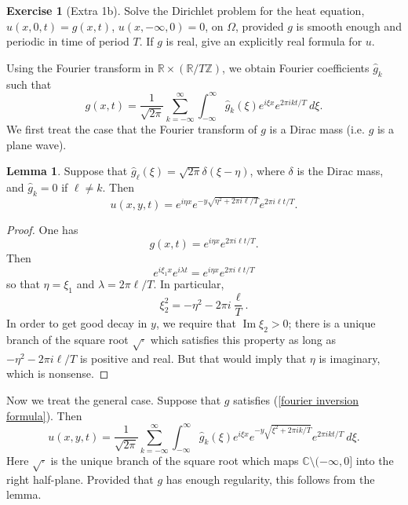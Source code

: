 \documentclass[10pt]{article}
\newcommand{\ZZ}{\mathbb{Z}}
\newcommand{\RR}{\mathbb{R}}
\newcommand{\CC}{\mathbb{C}}
\renewcommand{\Im}{\operatorname{Im}}
\theoremstyle{definition}
\newtheorem{exer}{Exercise}
\newtheorem{lemma}{Lemma}[exer]
\begin{document}
\begin{exer}[Extra 1b]
Solve the Dirichlet problem for the heat equation, $u(x, 0, t) = g(x, t)$, $u(x, -\infty, 0) = 0$, on $\Omega$, provided $g$ is smooth enough and periodic in time of period $T$.
If $g$ is real, give an explicitly real formula for $u$.
\end{exer}

Using the Fourier transform in $\RR \times (\RR/T\ZZ)$, we obtain Fourier coefficients $\hat g_k$ such that
\begin{equation}
\label{fourier inversion formula}
g(x, t) = \frac{1}{\sqrt{2\pi}} \sum_{k=-\infty}^\infty \int_{-\infty}^\infty \hat g_k(\xi) e^{i\xi x} e^{2\pi i kt/T}~d\xi.
\end{equation}
We first treat the case that the Fourier transform of $g$ is a Dirac mass (i.e. $g$ is a plane wave).

\begin{lemma}
Suppose that $\hat g_\ell(\xi) = \sqrt{2\pi}\delta(\xi - \eta)$, where $\delta$ is the Dirac mass, and $\hat g_k = 0$ if $\ell \neq k$.
Then
$$u(x, y, t) = e^{i\eta x} e^{-y\sqrt{\eta^2 + 2\pi i\ell/T}} e^{2\pi i\ell t/T}.$$
\end{lemma}
\begin{proof}
One has
$$g(x, t) = e^{i\eta x}e^{2\pi i\ell t/T}.$$
Then
$$e^{i\xi_1x}e^{i\lambda t} = e^{i\eta x} e^{2\pi i\ell t/T}$$
so that $\eta = \xi_1$ and $\lambda = 2\pi \ell/T$.
In particular,
$$\xi_2^2 = -\eta^2 - 2\pi i\frac{\ell}{T}.$$
In order to get good decay in $y$, we require that $\Im \xi_2 > 0$; there is a unique branch of the square root $\sqrt\cdot$ which satisfies this property as long as $-\eta^2 - 2\pi i\ell/T$ is positive and real.
But that would imply that $\eta$ is imaginary, which is nonsense.
\end{proof}

Now we treat the general case. Suppose that $g$ satisfies (\ref{fourier inversion formula}).
Then
$$u(x, y, t) = \frac{1}{\sqrt{2\pi}} \sum_{k=-\infty}^\infty \int_{-\infty}^\infty \hat g_k(\xi) e^{i\xi x} e^{-y\sqrt{\xi^2 + 2\pi ik/T}} e^{2\pi ik t/T}~d\xi.$$
Here $\sqrt\cdot$ is the unique branch of the square root which maps $\CC \setminus (-\infty, 0]$ into the right half-plane.
Provided that $g$ has enough regularity, this follows from the lemma.
\end{document}
